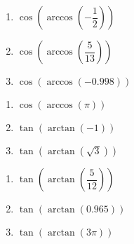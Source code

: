 \documentclass{ximera}
\begin{document}
\begin{multicols}{3}

\begin{enumerate}

\setcounter{enumi}{\value{HW}}

\item $\cos\left(\arccos\left(-\dfrac{1}{2}\right)\right)$
\item $\cos\left(\arccos\left(\dfrac{5}{13}\right)\right)$
\item $\cos\left(\arccos\left(-0.998\right)\right)$ 

\setcounter{HW}{\value{enumi}}

\end{enumerate}

\end{multicols}

\begin{multicols}{3}

\begin{enumerate}

\setcounter{enumi}{\value{HW}}

\item $\cos\left(\arccos\left(\pi \right)\right)$
\item $\tan\left(\arctan\left(-1\right)\right)$
\item $\tan\left(\arctan\left(\sqrt{3}\right)\right)$

\setcounter{HW}{\value{enumi}}

\end{enumerate}

\end{multicols}

\begin{multicols}{3}

\begin{enumerate}

\setcounter{enumi}{\value{HW}}

\item $\tan\left(\arctan\left(\dfrac{5}{12}\right)\right)$
\item $\tan\left(\arctan\left(0.965\right)\right)$ 
\item $\tan\left(\arctan\left( 3\pi \right)\right)$ 

\setcounter{HW}{\value{enumi}}

\end{enumerate}

\end{multicols}
\end{document}
